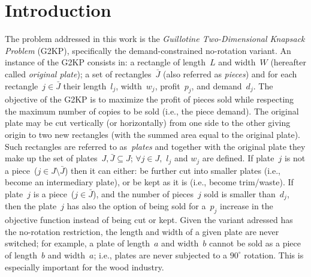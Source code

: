 \documentclass[runningheads]{llncs}
\begin{document}
 
\section{Introduction}

The problem addressed in this work is the \emph{Guillotine Two-Dimensional Knapsack Problem} (G2KP), specifically the demand-constrained no-rotation variant.
An instance of the G2KP consists in: a rectangle of length~\(L\) and width~\(W\) (hereafter called \emph{original plate}); a set of rectangles~\(\bar{J}\) (also referred as \emph{pieces}) and for each rectangle~\(j \in \bar{J}\) their length~\(l_j\), width~\(w_j\), profit~\(p_j\), and demand~\(d_j\).
The objective of the G2KP is to maximize the profit of pieces sold while respecting the maximum number of copies to be sold (i.e., the piece demand).
The original plate may be cut vertically (or horizontally) from one side to the other giving origin to two new rectangles (with the summed area equal to the original plate).
Such rectangles are referred to as~\emph{plates} and together with the original plate they make up the set of plates~\(J, \bar{J} \subseteq J\); \(\forall j \in J, \) \(l_j\) and \(w_j\) are defined. 
If plate~\(j\) is not a piece~(\(j \in J\setminus\bar{J}\)) then it can either: be further cut into smaller plates (i.e., become an intermediary plate), or be kept as it is (i.e., become trim/waste).
If plate~\(j\) is a piece~(\(j \in \bar{J}\)), and the number of pieces~\(j\) sold is smaller than~\(d_j\), then the plate~\(j\) has also the option of being sold for a~\(p_j\) increase in the objective function instead of being cut or kept.
Given the variant adressed has the no-rotation restriction, the length and width of a given plate are never switched; for example, a plate of length~\(a\) and width~\(b\) cannot be sold as a piece of length~\(b\) and width~\(a\); i.e., plates are never subjected to a \(90^\circ\) rotation. This is especially important for the wood industry.
\end{document}
